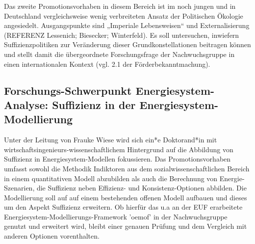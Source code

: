 \documentclass[a4paper,11pt,twoside]{scrartcl}
\begin{document}
Das zweite Promotionsvorhaben in diesem Bereich ist im noch jungen und in Deutschland vergleichsweise wenig verbreiteten Ansatz der Politischen Ökologie angesiedelt. Ausgangspunkte sind „Imperiale Lebensweisen“ \cite{Brand2017}und Externalisierung (REFERENZ Lessenich; Biesecker; Winterfeld). Es soll untersuchen, inwiefern Suffizienzpolitiken zur Veränderung dieser Grundkonstellationen beitragen können und stellt damit die übergeordnete Forschungsfrage der Nachwuchsgruppe in einen internationalen Kontext (vgl. 2.1 der Förderbekanntmachung).

\subsection*{Forschungs-Schwerpunkt Energiesystem-Analyse: Suffizienz in der Energiesystem-Modellierung}
Unter der Leitung von Frauke Wiese wird sich ein*e Doktorand*in mit wirtschaftsingenieurs-wissenschaftlichem Hintergrund auf die Abbildung von Suffizienz in Energiesystem-Modellen fokussieren. Das Promotionsvorhaben umfasst sowohl die Methodik Indiktoren aus dem sozialwissenschaftlichen Bereich in einem quantitativen Modell abzubilden als auch die Berechnung von Energie-Szenarien, die Suffizienz neben Effizienz- und Konsistenz-Optionen abbilden. Die Modellierung soll auf auf einem bestehenden offenen Modell aufbauen und dieses um den Aspekt Suffizienz erweitern. Ob hierfür das u.a an der EUF erarbeitete Energiesystem-Modellierungs-Framework 'oemof' in der Nachwuchsgruppe genutzt und erweitert wird, bleibt einer genauen Prüfung und dem Vergleich mit anderen Optionen vorenthalten.
\end{document}
